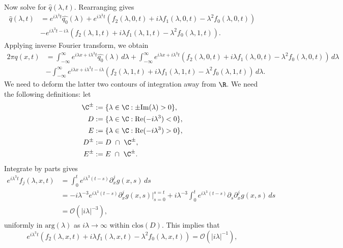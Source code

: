 Now solve for $\hat{q}(\lambda, t)$. Rearranging gives 
\begin{equation*}
\begin{aligned}
\hat{q}(\lambda, t) &= e^{i \lambda^3 t}\hat{q_0}(\lambda) + e^{i \lambda^3 t}\left(f_2(\lambda, 0, t) + i \lambda f_1(\lambda, 0, t) - \lambda^2 f_0(\lambda, 0, t)\right) \\
&- e^{i \lambda^3 t-i \lambda} \left(f_2(\lambda, 1, t) + i \lambda f_1(\lambda, 1, t) - \lambda^2 f_0(\lambda, 1, t)\right).
\end{aligned}
\end{equation*}
Applying inverse Fourier transform, we obtain
\begin{equation*}
\begin{aligned}
2\pi q(x, t) &= \int_{-\infty}^\infty e^{i\lambda x + i \lambda^3 t}\hat{q_0}(\lambda)\,d\lambda + \int_{-\infty}^\infty e^{i\lambda x + i \lambda^3 t}\left(f_2(\lambda, 0, t) + i \lambda f_1(\lambda, 0, t) - \lambda^2 f_0(\lambda, 0, t)\right)\,d\lambda \\
&- \int_{-\infty}^\infty e^{i\lambda x+i \lambda^3 t-i\lambda} \left(f_2(\lambda, 1, t) + i \lambda f_1(\lambda, 1, t) - \lambda^2 f_0(\lambda, 1, t)\right)\,d\lambda.
\end{aligned}
\end{equation*}
We need to deform the latter two contours of integration away from $\R$. We need the following definitions: let 
\begin{align*}
    \C^\pm &:= \{\lambda \in \C: \pm \mathrm{Im}(\lambda)>0\},\\
    D &:= \{\lambda \in \C: \mathrm{Re}(-i\lambda^3) < 0\}, \\
    E &:= \{\lambda \in \C: \mathrm{Re}(-i\lambda^3) > 0\},\\
    D^\pm & := D~\cap~\C^\pm,\\
    E^\pm & := E~\cap~\C^\pm.
\end{align*}
Integrate by parts gives
\begin{align*}
    e^{i\lambda^3t}f_j(\lambda,x,t) &= \int_0^t e^{i\lambda^3(t-s)}\partial_x^jg(x,s)\,ds\\
    &= -i\lambda^{-3}e^{i\lambda^3(t-s)}\partial_x^jg(x,s)\bigg|_{s=0}^{s=t} + i\lambda^{-3} \int_0^t e^{i\lambda^3(t-s)}\partial_s\partial_x^jg(x,s)\,ds\\
    &= \mathcal{O}(|i\lambda|^{-3}),
\end{align*}
uniformly in $\mathrm{arg}(\lambda)$ as $i\lambda \to \infty$ within $\mathrm{clos}(D)$. This implies that \[e^{i \lambda^3 t}\left(f_2(\lambda, x, t) + i \lambda f_1(\lambda, x, t) - \lambda^2 f_0(\lambda, x, t)\right) = \mathcal{O}(|i\lambda|^{-1}),\]

